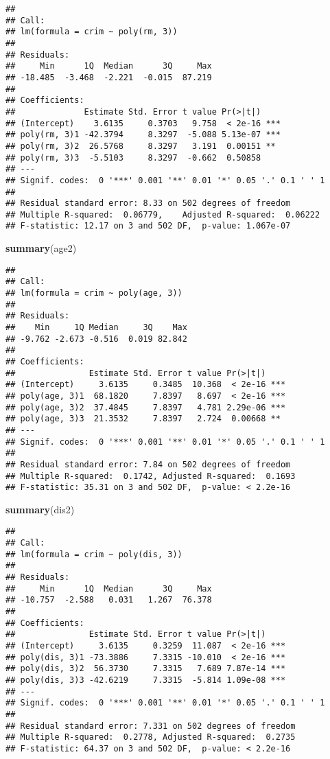 \documentclass[]{article}
\newenvironment{Shaded}{\begin{snugshade}}{\end{snugshade}}
\newcommand{\KeywordTok}[1]{\textcolor[rgb]{0.13,0.29,0.53}{\textbf{#1}}}
\newcommand{\NormalTok}[1]{#1}
\begin{document}
\begin{verbatim}
## 
## Call:
## lm(formula = crim ~ poly(rm, 3))
## 
## Residuals:
##     Min      1Q  Median      3Q     Max 
## -18.485  -3.468  -2.221  -0.015  87.219 
## 
## Coefficients:
##              Estimate Std. Error t value Pr(>|t|)    
## (Intercept)    3.6135     0.3703   9.758  < 2e-16 ***
## poly(rm, 3)1 -42.3794     8.3297  -5.088 5.13e-07 ***
## poly(rm, 3)2  26.5768     8.3297   3.191  0.00151 ** 
## poly(rm, 3)3  -5.5103     8.3297  -0.662  0.50858    
## ---
## Signif. codes:  0 '***' 0.001 '**' 0.01 '*' 0.05 '.' 0.1 ' ' 1
## 
## Residual standard error: 8.33 on 502 degrees of freedom
## Multiple R-squared:  0.06779,    Adjusted R-squared:  0.06222 
## F-statistic: 12.17 on 3 and 502 DF,  p-value: 1.067e-07
\end{verbatim}

\begin{Shaded}
\begin{Highlighting}[]
\KeywordTok{summary}\NormalTok{(age2)}
\end{Highlighting}
\end{Shaded}

\begin{verbatim}
## 
## Call:
## lm(formula = crim ~ poly(age, 3))
## 
## Residuals:
##    Min     1Q Median     3Q    Max 
## -9.762 -2.673 -0.516  0.019 82.842 
## 
## Coefficients:
##               Estimate Std. Error t value Pr(>|t|)    
## (Intercept)     3.6135     0.3485  10.368  < 2e-16 ***
## poly(age, 3)1  68.1820     7.8397   8.697  < 2e-16 ***
## poly(age, 3)2  37.4845     7.8397   4.781 2.29e-06 ***
## poly(age, 3)3  21.3532     7.8397   2.724  0.00668 ** 
## ---
## Signif. codes:  0 '***' 0.001 '**' 0.01 '*' 0.05 '.' 0.1 ' ' 1
## 
## Residual standard error: 7.84 on 502 degrees of freedom
## Multiple R-squared:  0.1742, Adjusted R-squared:  0.1693 
## F-statistic: 35.31 on 3 and 502 DF,  p-value: < 2.2e-16
\end{verbatim}

\begin{Shaded}
\begin{Highlighting}[]
\KeywordTok{summary}\NormalTok{(dis2)}
\end{Highlighting}
\end{Shaded}

\begin{verbatim}
## 
## Call:
## lm(formula = crim ~ poly(dis, 3))
## 
## Residuals:
##     Min      1Q  Median      3Q     Max 
## -10.757  -2.588   0.031   1.267  76.378 
## 
## Coefficients:
##               Estimate Std. Error t value Pr(>|t|)    
## (Intercept)     3.6135     0.3259  11.087  < 2e-16 ***
## poly(dis, 3)1 -73.3886     7.3315 -10.010  < 2e-16 ***
## poly(dis, 3)2  56.3730     7.3315   7.689 7.87e-14 ***
## poly(dis, 3)3 -42.6219     7.3315  -5.814 1.09e-08 ***
## ---
## Signif. codes:  0 '***' 0.001 '**' 0.01 '*' 0.05 '.' 0.1 ' ' 1
## 
## Residual standard error: 7.331 on 502 degrees of freedom
## Multiple R-squared:  0.2778, Adjusted R-squared:  0.2735 
## F-statistic: 64.37 on 3 and 502 DF,  p-value: < 2.2e-16
\end{verbatim}
\end{document}

